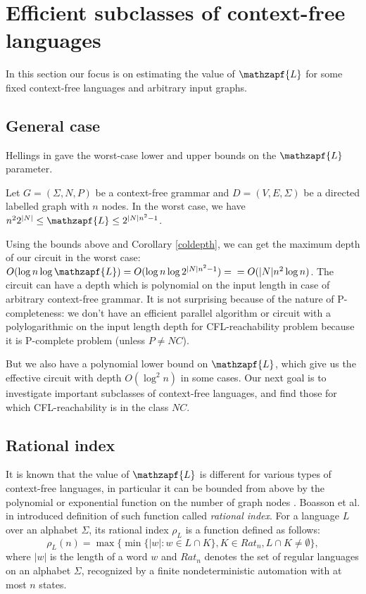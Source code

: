 \section{Efficient subclasses of context-free languages}
\label{sec:cfl}
In this section our focus is on estimating the value of $\mathzapf{L}$ for some fixed context-free languages and arbitrary input graphs. 
\subsection{General case}
Hellings in \cite{HellingsCFPQ} gave the worst-case lower and upper bounds on the $\mathzapf{L}$ parameter.
\begin{theorem}[Hellings]
Let  $G = (\Sigma, N, P)$ be a context-free grammar and $D=(V, E, \Sigma)$ be a directed labelled graph with $n$ nodes. In the worst case, we have $ n^22^{|N|}\le \mathzapf{L} \le 2^{|N|n^2-1}$.
\end{theorem}


Using the bounds above and Corollary \ref{coldepth}, we can get the maximum depth of our circuit in the worst case: 
$O(\log n \log \mathzapf{L}) = O(\log n \log 2^{|N|n^2-1}) = \\ = O(|N|n^2\log n)$. The circuit can have a depth which is polynomial on the input length in case of arbitrary context-free grammar. It is not surprising because of the nature of P-completeness: we don't have an efficient parallel algorithm or circuit with a polylogarithmic on the input length depth for CFL-reachability problem because it is P-complete problem (unless $P \neq NC$).


But we also have a polynomial lower bound on $\mathzapf{L}$, which give us the effective circuit with depth $O(\log^2 n)$ in some cases. Our next goal is to investigate important subclasses of context-free languages, and find those for which CFL-reachability is in the class $NC$.
\subsection{Rational index}
It is known that the value of $\mathzapf{L}$ is different for various types of context-free languages, in particular it can be bounded from above by the polynomial or exponential function on the number of graph nodes \cite*{Dyck1, CFRat, GreibRat}. Boasson et al. in \cite{RatBasic} introduced definition of such function called \textit{rational index}. For a language $L$ over an alphabet $\Sigma$, its rational index $\rho_L$ is a function defined as follows:
\begin{equation}
\rho_L(n) = \max\{\min\{|w|:w \in L \cap K\}, K \in {Rat}_n, L \cap K \neq \emptyset\},
\end{equation} where $|w|$ is the length of a word $w$ and ${Rat}_n$ denotes the set of regular languages on an alphabet $\Sigma$, recognized by a finite nondeterministic automation with at most $n$ states.


